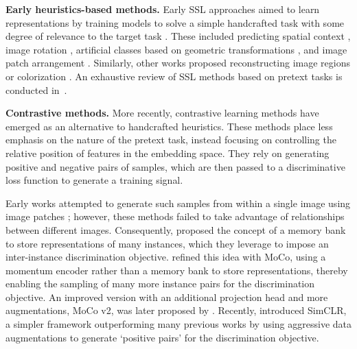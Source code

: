 \documentclass[times,twocolumn,final]{elsarticle}
\begin{document}
{\color{changetext} \noindent\textbf{Early heuristics-based methods.}}
Early SSL approaches aimed to learn representations by training models to solve a simple handcrafted task with some degree of relevance to the target task \citep{kim2018learning}.
These included predicting spatial context \citep{doersch2015unsupervised}, image rotation \citep{gidaris2018unsupervised}, artificial classes based on geometric transformations \citep{dosovitskiy2014discriminative}, and image patch arrangement \citep{noroozi2016unsupervised}.
Similarly, other works proposed reconstructing image regions \citep{pathak2016context} or colorization \citep{zhang2016colorful, zhang2017split}.
An exhaustive review of SSL methods based on pretext tasks is conducted in~\cite{jing2020self}.

\noindent\textbf{Contrastive methods.} 
More recently, contrastive learning methods have emerged as an alternative to handcrafted heuristics. These methods place less emphasis on the nature of the pretext task, instead focusing on controlling the relative position of features in the embedding space. They rely on generating positive and negative pairs of samples, which are then passed to a discriminative loss function to generate a training signal.

Early works attempted to generate such samples from within a single image using image patches \citep{10.5555/2968826.2968912, oord2018representation}; however, these methods failed to take advantage of relationships between different images.
Consequently, \cite{wu2018unsupervised} proposed the concept of a memory bank to store representations of many instances, which they leverage to impose an inter-instance discrimination objective.
\cite{he2020momentum} refined this idea with MoCo, using a momentum encoder rather than a memory bank to store representations, thereby enabling the sampling of many more instance pairs for the discrimination objective. An improved version with an additional projection head and more augmentations, MoCo v2, was later proposed by \cite{chen2020improved}.
Recently, \cite{chen2020simple} introduced SimCLR, a simpler framework outperforming many previous works \citep{oord2018representation, bachman2019learning, henaff2020data, tian2020contrastive, misra2020self} by using aggressive data augmentations to generate `positive pairs' for the discrimination objective.
\end{document}
